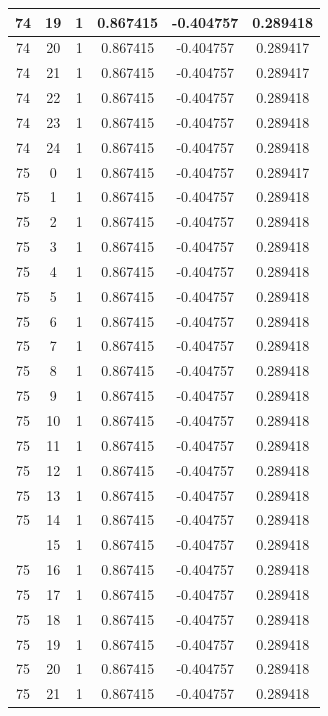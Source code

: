 \documentclass[12pt,a4paper]{article}
\numberwithin{equation}{section}
\numberwithin{figure}{section}
\numberwithin{table}{section}
\begin{document}
\begin{longtable}{|c|c|c|c|c|c|}
74 & 19 & 1 & 0.867415 & -0.404757 & 0.289418 \\ \hline
74 & 20 & 1 & 0.867415 & -0.404757 & 0.289417 \\ \hline
74 & 21 & 1 & 0.867415 & -0.404757 & 0.289417 \\ \hline
74 & 22 & 1 & 0.867415 & -0.404757 & 0.289418 \\ \hline
74 & 23 & 1 & 0.867415 & -0.404757 & 0.289418 \\ \hline
74 & 24 & 1 & 0.867415 & -0.404757 & 0.289418 \\ \hline
75 & 0 & 1 & 0.867415 & -0.404757 & 0.289417 \\ \hline
75 & 1 & 1 & 0.867415 & -0.404757 & 0.289418 \\ \hline
75 & 2 & 1 & 0.867415 & -0.404757 & 0.289418 \\ \hline
75 & 3 & 1 & 0.867415 & -0.404757 & 0.289418 \\ \hline
75 & 4 & 1 & 0.867415 & -0.404757 & 0.289418 \\ \hline
75 & 5 & 1 & 0.867415 & -0.404757 & 0.289418 \\ \hline
75 & 6 & 1 & 0.867415 & -0.404757 & 0.289418 \\ \hline
75 & 7 & 1 & 0.867415 & -0.404757 & 0.289418 \\ \hline
75 & 8 & 1 & 0.867415 & -0.404757 & 0.289418 \\ \hline
75 & 9 & 1 & 0.867415 & -0.404757 & 0.289418 \\ \hline
75 & 10 & 1 & 0.867415 & -0.404757 & 0.289418 \\ \hline
75 & 11 & 1 & 0.867415 & -0.404757 & 0.289418 \\ \hline
75 & 12 & 1 & 0.867415 & -0.404757 & 0.289418 \\ \hline
75 & 13 & 1 & 0.867415 & -0.404757 & 0.289418 \\ \hline
75 & 14 & 1 & 0.867415 & -0.404757 & 0.289418 \\ \hline
\pagebreak
75 & 15 & 1 & 0.867415 & -0.404757 & 0.289418 \\ \hline
75 & 16 & 1 & 0.867415 & -0.404757 & 0.289418 \\ \hline
75 & 17 & 1 & 0.867415 & -0.404757 & 0.289418 \\ \hline
75 & 18 & 1 & 0.867415 & -0.404757 & 0.289418 \\ \hline
75 & 19 & 1 & 0.867415 & -0.404757 & 0.289418 \\ \hline
75 & 20 & 1 & 0.867415 & -0.404757 & 0.289418 \\ \hline
75 & 21 & 1 & 0.867415 & -0.404757 & 0.289418 \\ \hline

\end{longtable}
\end{document}
